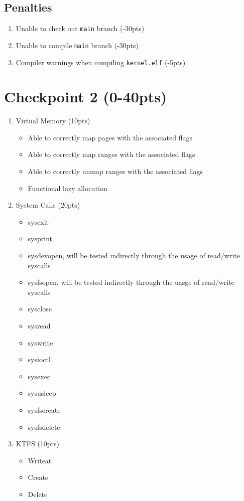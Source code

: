 \documentclass{article}
\begin{document}
\subsection*{Penalties}

\begin{enumerate}
    \item Unable to check out \texttt{main} branch (-30pts)
    \item Unable to compile \texttt{main} branch (-30pts)
    \item Compiler warnings when compiling \texttt{kernel.elf} (-5pts)
\end{enumerate}

\section*{Checkpoint 2 (0-40pts)}
    \begin{enumerate}
        \item Virtual Memory (10pts)
            \begin{itemize}
                \item Able to correctly map pages with the associated flags
                \item Able to correctly map ranges with the associated flags
                \item Able to correctly unmap ranges with the associated flags
                \item Functional lazy allocation
            \end{itemize}
        \item System Calls (20pts)
            \begin{itemize}
                \item sysexit
                \item sysprint 
                \item sysdevopen, will be tested indirectly through the usage of read/write syscalls
                \item sysfsopen, will be tested indirectly through the uasge of read/write syscalls
                \item sysclose 
                \item sysread 		
                \item syswrite 
                \item sysioctl 
                \item sysexec 
                \item sysusleep 
                \item sysfscreate  
                \item  sysfsdelete 
            \end{itemize}
        \item KTFS (10pts)
            \begin{itemize}
                \item Writeat
                \item Create
                \item Delete
            \end{itemize}   
    \end{enumerate}
\end{document}
